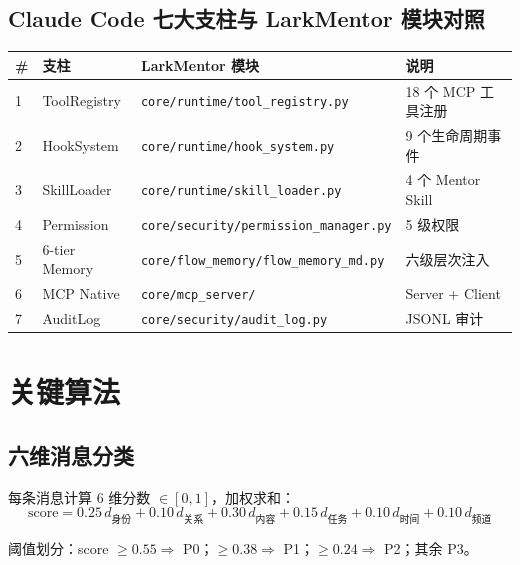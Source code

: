 \documentclass[11pt,a4paper]{ctexart}
\begin{document}
\subsection{Claude Code 七大支柱与 LarkMentor 模块对照}

{\small
\begin{tabular}{p{0.5cm}p{3.0cm}>{\raggedright\arraybackslash}p{5.8cm}p{4.8cm}}
\toprule
\textbf{\#} & \textbf{支柱} & \textbf{LarkMentor 模块} & \textbf{说明} \\
\midrule
1 & ToolRegistry & \texttt{core/runtime/}\newline\texttt{tool\_registry.py} & 18 个 MCP 工具注册 \\
2 & HookSystem & \texttt{core/runtime/}\newline\texttt{hook\_system.py} & 9 个生命周期事件 \\
3 & SkillLoader & \texttt{core/runtime/}\newline\texttt{skill\_loader.py} & 4 个 Mentor Skill \\
4 & Permission & \texttt{core/security/}\newline\texttt{permission\_manager.py} & 5 级权限 \\
5 & 6-tier Memory & \texttt{core/flow\_memory/}\newline\texttt{flow\_memory\_md.py} & 六级层次注入 \\
6 & MCP Native & \texttt{core/mcp\_server/} & Server + Client \\
7 & AuditLog & \texttt{core/security/}\newline\texttt{audit\_log.py} & JSONL 审计 \\
\bottomrule
\end{tabular}
}

\section{关键算法}

\subsection{六维消息分类}

每条消息计算 6 维分数 $\in [0,1]$，加权求和：
\[
\text{score} = 0.25\,d_{\text{身份}} + 0.10\,d_{\text{关系}} + 0.30\,d_{\text{内容}} + 0.15\,d_{\text{任务}} + 0.10\,d_{\text{时间}} + 0.10\,d_{\text{频道}}
\]

阈值划分：score $\geq 0.55 \Rightarrow$ P0；$\geq 0.38 \Rightarrow$ P1；$\geq 0.24 \Rightarrow$ P2；其余 P3。
\end{document}
